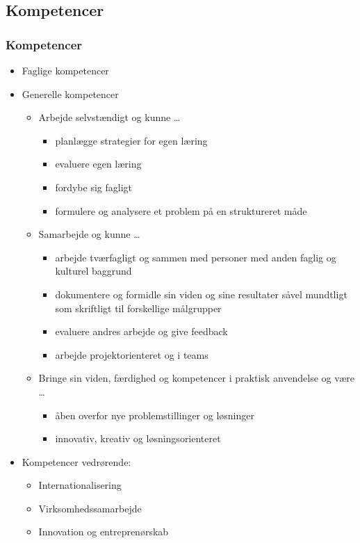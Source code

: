 \documentclass[t, aspectratio=169]{beamer}
\begin{document}
\subsection{Kompetencer}
\begin{frame}[fragile]
  \frametitle{Kompetencer}
  \vspace{-3mm}
  \begin{itemize}
    \pause
    \item Faglige kompetencer
    \pause
    \item Generelle kompetencer
      \begin{itemize}
        \pause
        \item Arbejde selvstændigt og kunne \ldots
          \begin{itemize}
            \item planlægge strategier for egen læring
            \item evaluere egen læring
            \item fordybe sig fagligt
            \item formulere og analysere et problem på en struktureret måde
          \end{itemize}
        \pause
        \item Samarbejde og kunne \ldots
          \begin{itemize}
            \item arbejde tværfagligt og sammen med personer med anden faglig og kulturel
baggrund
            \item dokumentere og formidle sin viden og sine resultater såvel
mundtligt som skriftligt til forskellige målgrupper
            \item evaluere andres arbejde og give feedback
            \item arbejde projektorienteret og i teams
          \end{itemize}
        \pause
        \item Bringe sin viden, færdighed og kompetencer i praktisk anvendelse og være \ldots
          \begin{itemize}
            \item åben overfor nye problemstillinger og løsninger
            \item innovativ, kreativ og løsningsorienteret
          \end{itemize}
      \end{itemize}
    \pause
    \item Kompetencer vedrørende:
      \begin{itemize}
        \item Internationalisering
        \item Virksomhedssamarbejde
        \item Innovation og entreprenørskab
      \end{itemize}
  \end{itemize}
\end{frame}
\end{document}
